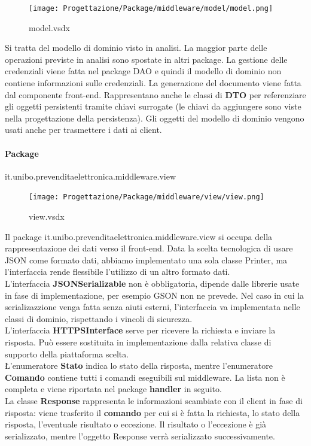 \documentclass[a4paper]{article}
\begin{document}


\begin{figure}[H]
    \texttt{[image: Progettazione/Package/middleware/model/model.png]}
    \centering
    \caption{model.vsdx}
\end{figure}

Si tratta del modello di dominio visto in analisi. La maggior parte delle operazioni previste in analisi sono spostate in altri package. La gestione delle credenziali viene fatta nel package DAO e quindi il modello di dominio non contiene informazioni sulle credenziali. La generazione del documento viene fatta dal componente front-end. Rappresentano anche le classi di \textbf{DTO} per referenziare gli oggetti persistenti tramite chiavi surrogate (le chiavi da aggiungere sono viste nella progettazione della persistenza). Gli oggetti del modello di dominio vengono usati anche per trasmettere i dati ai client.

\newpage

\paragraph{Package} it.unibo.prevenditaelettronica.middleware.view



\begin{figure}[H]
    \texttt{[image: Progettazione/Package/middleware/view/view.png]}
    \centering
    \caption{view.vsdx}
\end{figure}

Il package it.unibo.prevenditaelettronica.middleware.view si occupa della rappresentazione dei dati verso il front-end. Data la scelta tecnologica di usare JSON come formato dati, abbiamo implementato una sola classe Printer, ma l'interfaccia rende flessibile l'utilizzo di un altro formato dati.\\L'interfaccia \textbf{JSONSerializable} non è obbligatoria, dipende dalle librerie usate in fase di implementazione, per esempio GSON non ne prevede. Nel caso in cui la serializazzione venga fatta senza aiuti esterni, l'interfaccia va implementata nelle classi di dominio, rispettando i vincoli di sicurezza.\\L'interfaccia \textbf{HTTPSInterface} serve per ricevere la richiesta e inviare la risposta. Può essere sostituita in implementazione dalla relativa classe di supporto della piattaforma scelta.\\\L'enumeratore \textbf{Stato} indica lo stato della risposta, mentre l'enumeratore \textbf{Comando} contiene tutti i comandi eseguibili sul middleware. La lista non è completa e viene riportata nel package \textbf{handler} in seguito.\\La classe \textbf{Response} rappresenta le informazioni scambiate con il client in fase di risposta: viene trasferito il \textbf{comando} per cui si è fatta la richiesta, lo stato della risposta, l'eventuale risultato o eccezione. Il risultato o l'eccezione è già serializzato, mentre l'oggetto Response verrà serializzato successivamente.
\end{document}
